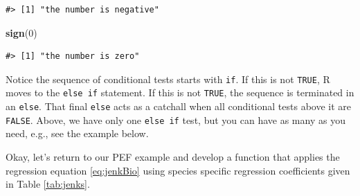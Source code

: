 \documentclass[
  11pt,
]{krantz}
\newenvironment{Shaded}{\begin{snugshade}}{\end{snugshade}}
\newcommand{\DecValTok}[1]{\textcolor[rgb]{0.00,0.00,0.81}{#1}}
\newcommand{\KeywordTok}[1]{\textcolor[rgb]{0.13,0.29,0.53}{\textbf{#1}}}
\newcommand{\NormalTok}[1]{#1}
\theoremstyle{definition}
\theoremstyle{definition}
\theoremstyle{definition}
\theoremstyle{definition}
\theoremstyle{remark}
\begin{document}
\begin{verbatim}
#> [1] "the number is negative"
\end{verbatim}

\begin{Shaded}
\begin{Highlighting}[]
\KeywordTok{sign}\NormalTok{(}\DecValTok{0}\NormalTok{)}
\end{Highlighting}
\end{Shaded}

\begin{verbatim}
#> [1] "the number is zero"
\end{verbatim}

Notice the sequence of conditional tests starts with \texttt{if}. If this is not \texttt{TRUE}, R moves to the \texttt{else\ if} statement. If this is not \texttt{TRUE}, the sequence is terminated in an \texttt{else}. That final \texttt{else} acts as a catchall when all conditional tests above it are \texttt{FALSE}. Above, we have only one \texttt{else\ if} test, but you can have as many as you need, e.g., see the example below.

Okay, let's return to our PEF example and develop a function that applies the regression equation \eqref{eq:jenkBio} using species specific regression coefficients given in Table \ref{tab:jenks}.
\end{document}
